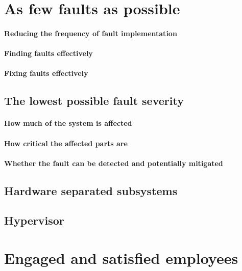 
\section{As few faults as possible}
\paragraph{Reducing the frequency of fault implementation}
\paragraph{Finding faults effectively}
\paragraph{Fixing faults effectively}
\subsection{The lowest possible fault severity}
\paragraph{How much of the system is affected}
\paragraph{How critical the affected parts are}
\paragraph{Whether the fault can be detected and potentially mitigated}

\subsection{Hardware separated subsystems}
\subsection{Hypervisor}


\section{Engaged and satisfied employees}

